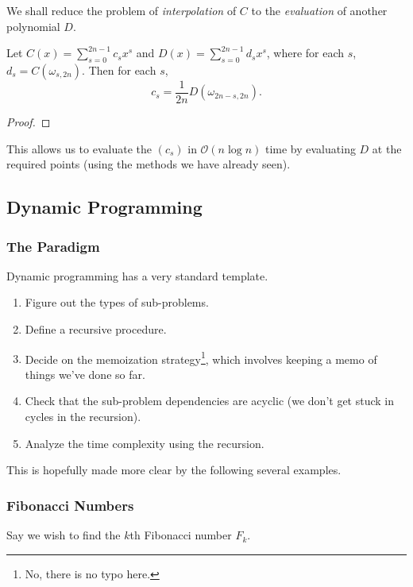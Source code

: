 We shall reduce the problem of \textit{interpolation} of $C$ to the \textit{evaluation} of another polynomial $D$.

\begin{lemma*}
	Let $C(x)=\sum_{s=0}^{2n-1} c_s x^s$ and $D(x)=\sum_{s=0}^{2n-1} d_s x^s$, where for each $s$, $d_s = C(\omega_{s,2n})$. Then for each $s$,
	\[ c_s = \frac{1}{2n} D(\omega_{2n-s,2n}). \]
\end{lemma*}
\begin{proof}

\end{proof}

This allows us to evaluate the $(c_s)$ in $\mathcal{O}(n\log n)$ time by evaluating $D$ at the required points (using the methods we have already seen).

\subsection{Dynamic Programming}

\subsubsection{The Paradigm}

Dynamic programming has a very standard template.

\begin{enumerate}
	\item Figure out the types of sub-problems.
	\item Define a recursive procedure.
	\item Decide on the memoization strategy\footnote{No, there is no typo here.}, which involves keeping a memo of things we've done so far.
	\item Check that the sub-problem dependencies are acyclic (we don't get stuck in cycles in the recursion).
	\item Analyze the time complexity using the recursion.
\end{enumerate}

This is hopefully made more clear by the following several examples.

\subsubsection{Fibonacci Numbers}

Say we wish to find the $k$th Fibonacci number $F_k$.\\

